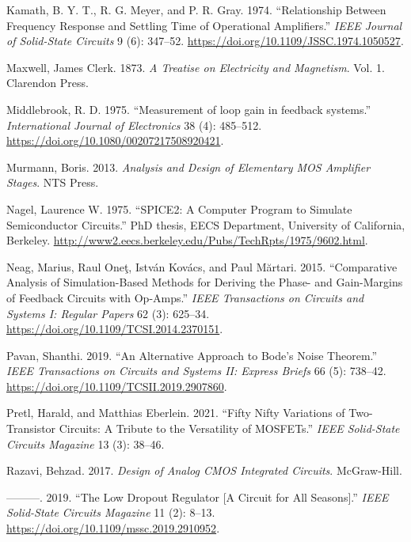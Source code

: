 \documentclass[
  a4paper,
  DIV=11,
  numbers=noendperiod]{scrartcl}
\newlength{\cslhangindent}
\newenvironment{CSLReferences}[2] %
 {\begin{list}{}{%
  \setlength{\itemindent}{0pt}
  \setlength{\leftmargin}{0pt}
  \setlength{\parsep}{0pt}
  \ifodd #1
   \setlength{\leftmargin}{\cslhangindent}
   \setlength{\itemindent}{-1\cslhangindent}
  \fi
  \setlength{\itemsep}{#2\baselineskip}}}
 {\end{list}}
\begin{document}
\begin{CSLReferences}{1}{0}
Kamath, B. Y. T., R. G. Meyer, and P. R. Gray. 1974. {``Relationship
Between Frequency Response and Settling Time of Operational
Amplifiers.''} \emph{IEEE Journal of Solid-State Circuits} 9 (6):
347--52. \url{https://doi.org/10.1109/JSSC.1974.1050527}.

Maxwell, James Clerk. 1873. \emph{A Treatise on Electricity and
Magnetism}. Vol. 1. Clarendon Press.

Middlebrook, R. D. 1975. {``{Measurement of loop gain in feedback
systems}.''} \emph{International Journal of Electronics} 38 (4):
485--512. \url{https://doi.org/10.1080/00207217508920421}.

Murmann, Boris. 2013. \emph{{Analysis and Design of Elementary MOS
Amplifier Stages}}. NTS Press.

Nagel, Laurence W. 1975. {``SPICE2: A Computer Program to Simulate
Semiconductor Circuits.''} PhD thesis, EECS Department, University of
California, Berkeley.
\url{http://www2.eecs.berkeley.edu/Pubs/TechRpts/1975/9602.html}.

Neag, Marius, Raul Oneţ, István Kovács, and Paul Mărtari. 2015.
{``Comparative Analysis of Simulation-Based Methods for Deriving the
Phase- and Gain-Margins of Feedback Circuits with Op-Amps.''} \emph{IEEE
Transactions on Circuits and Systems I: Regular Papers} 62 (3): 625--34.
\url{https://doi.org/10.1109/TCSI.2014.2370151}.

Pavan, Shanthi. 2019. {``An Alternative Approach to Bode's Noise
Theorem.''} \emph{IEEE Transactions on Circuits and Systems II: Express
Briefs} 66 (5): 738--42.
\url{https://doi.org/10.1109/TCSII.2019.2907860}.

Pretl, Harald, and Matthias Eberlein. 2021. {``Fifty Nifty Variations of
Two-Transistor Circuits: A Tribute to the Versatility of MOSFETs.''}
\emph{IEEE Solid-State Circuits Magazine} 13 (3): 38--46.

Razavi, Behzad. 2017. \emph{{Design of Analog CMOS Integrated
Circuits}}. McGraw-Hill.

---------. 2019. {``{The Low Dropout Regulator {[}A Circuit for All
Seasons{]}}.''} \emph{IEEE Solid-State Circuits Magazine} 11 (2): 8--13.
\url{https://doi.org/10.1109/mssc.2019.2910952}.


\end{CSLReferences}
\end{document}
